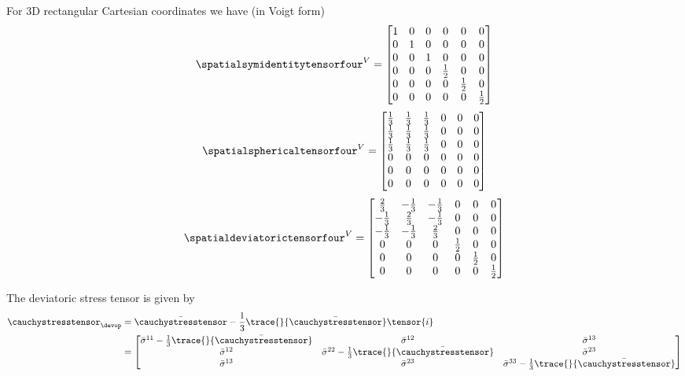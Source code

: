 For 3D rectangular Cartesian coordinates we have (in Voigt form)
\begin{equation}
  \spatialsymidentitytensorfour^{V}=\begin{bmatrix}
    1 & 0 & 0 & 0 & 0 & 0 \\
    0 & 1 & 0 & 0 & 0 & 0 \\
    0 & 0 & 1 & 0 & 0 & 0 \\
    0 & 0 & 0 & \frac{1}{2} & 0 & 0 \\
    0 & 0 & 0 & 0 & \frac{1}{2} & 0 \\
    0 & 0 & 0 & 0 & 0 & \frac{1}{2}
  \end{bmatrix}
\end{equation}
\begin{equation}
  \spatialsphericaltensorfour^{V}=\begin{bmatrix}
    \frac{1}{3} & \frac{1}{3} & \frac{1}{3} & 0 & 0 & 0 \\
    \frac{1}{3} & \frac{1}{3} & \frac{1}{3} & 0 & 0 & 0 \\
    \frac{1}{3} & \frac{1}{3} & \frac{1}{3} & 0 & 0 & 0 \\
    0 & 0 & 0 & 0 & 0 & 0 \\
    0 & 0 & 0 & 0 & 0 & 0 \\
    0 & 0 & 0 & 0 & 0 & 0 
  \end{bmatrix}
\end{equation}
\begin{equation}
  \spatialdeviatorictensorfour^{V}=\begin{bmatrix}
    \frac{2}{3} & -\frac{1}{3} & -\frac{1}{3} & 0 & 0 & 0 \\
    -\frac{1}{3} & \frac{2}{3} & -\frac{1}{3} & 0 & 0 & 0 \\
    -\frac{1}{3} & -\frac{1}{3} & \frac{2}{3} & 0 & 0 & 0 \\
    0 & 0 & 0 & \frac{1}{2} & 0 & 0 \\
    0 & 0 & 0 & 0 & \frac{1}{2} & 0 \\
    0 & 0 & 0 & 0 & 0 & \frac{1}{2}
  \end{bmatrix}
\end{equation}

The deviatoric stress tensor is given by
\begin{equation}
  \begin{split}
    \cauchystresstensor_{\devop}&=\bar{\cauchystresstensor}-\dfrac{1}{3}\trace{}{\bar{\cauchystresstensor}}\tensor{i}
    \\
    &=\begin{bmatrix}
    \bar{\sigma}^{11}-\frac{1}{3}\trace{}{\bar{\cauchystresstensor}} &
    \bar{\sigma}^{12} & \bar{\sigma}^{13} \\
    \bar{\sigma}^{12} &
    \bar{\sigma}^{22}-\frac{1}{3}\trace{}{\bar{\cauchystresstensor}} &
    \bar{\sigma}^{23} \\ 
    \bar{\sigma}^{13} & \bar{\sigma}^{23} &
    \bar{\sigma}^{33}-\frac{1}{3}\trace{}{\bar{\cauchystresstensor}}
    \end{bmatrix}
  \end{split}
\end{equation}

